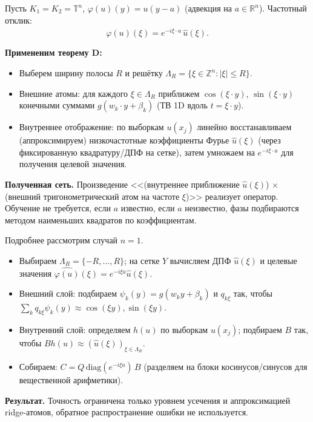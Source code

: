 \documentclass[../NDCNNAI_main.tex]{subfiles}
\begin{document}
\begin{example}

Пусть \( K_1 = K_2 = \mathbb{T}^n \), \( \varphi(u)(y) = u(y - a) \) (адвекция на \( a \in \mathbb{R}^n \)). Частотный отклик:  
\[
\widehat{\varphi(u)} (\xi) = e^{-i\xi\cdot a} \, \widehat{u}(\xi).
\]

\textbf{Примененим теорему D:}

\begin{itemize}
\item Выберем ширину полосы \( R \) и решётку \( \Lambda_R = \{ \xi \in \mathbb{Z}^n \colon |\xi| \leq R \} \).
\item Внешние атомы: для каждого \( \xi \in \Lambda_R \) приближем \( \cos(\xi \cdot y) \), \( \sin(\xi \cdot y) \) конечными суммами \( g(w_k \cdot y + \beta_k) \) (ТВ 1D вдоль \( t = \xi \cdot y \)).
\item Внутреннее отображение: по выборкам \( u(x_j) \) линейно восстанавливаем (аппроксимируем) низкочастотные коэффициенты Фурье \( \widehat{u}(\xi) \) (через фиксированную квадратуру/ДПФ на сетке), затем умножаем на \( e^{-i\xi\cdot a} \) для получения целевой значения.
\end{itemize}

\textbf{Полученная сеть.} Произведение <<(внутреннее приближение \( \widehat{u}(\xi) \)) $\times$ (внешний тригонометрический атом на частоте \( \xi \))>> реализует оператор. Обучение не требуется, если \( a \) известно, если \( a \) неизвестно, фазы подбираются методом наименьших квадратов по коэффициентам.

Подробнее рассмотрим случай $n = 1$.
\begin{itemize}
\item Выбираем \( \Lambda_R = \{-R, \ldots, R\} \); на сетке \( Y \) вычисляем ДПФ \( \widehat{u}(\xi) \) и целевые значения \( \widehat{\varphi(u)}(\xi) = e^{-i\xi a}\widehat{u}(\xi) \).
\item Внешний слой: подбираем \( \psi_k(y) = g(w_k y + \beta_k) \) и \( q_{k\xi} \) так, чтобы \( \sum_k q_{k\xi} \psi_k(y) \approx \cos(\xi y), \sin(\xi y) \).
\item Внутренний слой: определяем \( h(u) \) по выборкам \( u(x_j) \); подбираем \( B \) так, чтобы \( B h(u) \approx (\widehat{u}(\xi))_{\xi \in \Lambda_R} \).
\item Собираем: \( C = Q \, \text{diag}( e^{-i\xi a} ) \, B \) (разделяем на блоки косинусов/синусов для вещественной арифметики).
\end{itemize}

\textbf{Результат.} Точность ограничена только уровнем усечения и аппроксимацией ridge-атомов, обратное распространение ошибки не используется.
\end{example}
\end{document}
